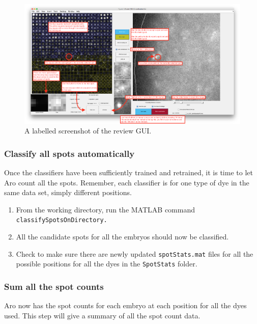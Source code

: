 \documentclass[titlepage,11pt]{article}
\begin{document}
\begin{landscape}
\begin{figure}
\begin{center}
\includegraphics[scale=0.35]{reviewFISHClassificationGUI.png}
\end{center}
\caption{A labelled screenshot of the review GUI.}
\label{fig:reviewFISHClassificationGUI}
\end{figure} 
\end{landscape}

\subsubsection{Classify all spots automatically}
Once the classifiers have been sufficiently trained and retrained, it is time to let Aro count all the spots. Remember, each classifier is for one type of dye in the same data set, simply different positions.

\begin{enumerate}
\item From the working directory, run the MATLAB command \texttt{classifySpotsOnDirectory.}
\item All the candidate spots for all the embryos should now be classified.
\item Check to make sure there are newly updated \texttt{spotStats.mat} files for all the possible positions for all the dyes in the \texttt{SpotStats} folder.
\end{enumerate}

\subsubsection{Sum all the spot counts}

Aro now has the spot counts for each embryo at each position for all the dyes used. This step will give a summary of all the spot count data.
\end{document}
